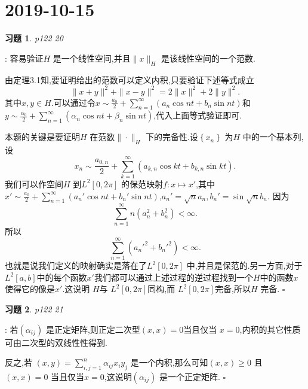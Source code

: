 \documentclass[a4paper]{article}
\newtheorem*{exe}{习题}
\newenvironment{sol}{{\noindent\bfseries 解}:}{\hfill $\square$\par}
\begin{document}
\section{2019-10-15}
\begin{exe}
  p122 20	
\end{exe}
\begin{sol}
  容易验证$H$ 是一个线性空间,并且$\|x\|_H$ 是该线性空间的一个范数.

  由定理3.1知,要证明给出的范数可以定义内积,只要验证下述等式成立
   \[
  \|x+y\|^2+\|x-y\|^2=2\|x\|^2+2\|y\|^2
  .\] 
  其中$x,y\in H$.可以通过令$x\sim \frac{a_0}{2}+\sum_{n=1}^{\infty} \left( a_n\cos nt +b_n\sin nt \right) $和$y\sim\frac{\alpha_0}{2}+\sum_{n=1}^{\infty} \left( \alpha_n\cos nt+\beta_n\sin nt \right) $,代入上面等式验证即可.

  本题的关键是要证明$H$ 在范数$\|\cdot \|_H$ 下的完备性.设$\left\{ x_n \right\} $ 为$H$ 中的一个基本列,设
  \[
    x_n\sim\frac{a_{0,n}}{2}+\sum_{k=1}^{\infty} \left( a_{k,n}\cos kt +b_{k,n}\sin kt \right) 
  .\] 
  我们可以作空间$H$ 到$L^2[0,2\pi]$ 的保范映射$f:x\mapsto x'$,其中$x'\sim \frac{a_0}{2}+\sum_{n=1}^{\infty} \left( a_n'\cos nt+b_n'\sin nt \right) $,$a_n'=\sqrt{n} a_n,b_n'=\sin\sqrt{n} b_n$.
  因为
  \[
    \sum_{n=1}^{\infty} n\left( a_n^2+b_n^2 \right) <\infty
  .\] 
  所以
   \[
     \sum_{n=1}^{\infty} \left( a_n'^2+b_n'^2 \right) <\infty
  .\] 
  也就是说我们定义的映射确实是落在了$L^2[0,2\pi]$ 中,并且是保范的.另一方面,对于$L^2[a,b]$中的每个函数$x'$我们都可以通过上述过程的逆过程找到一个$H$中的函数$x$使得它的像是$x'$.这说明 $H$与 $L^2[0,2\pi]$同构,而 $L^2[0,2\pi]$完备,所以$H$ 完备.
\end{sol}
\begin{exe}
  p122 21
\end{exe}
\begin{sol}
  若$\left(\alpha_{ij}\right)$ 是正定矩阵,则正定二次型$(x,x)=0$当且仅当 $x=0$,内积的其它性质可由二次型的双线性性得到.

  反之,若 $(x,y)=\sum_{i,j=1}^{n} \alpha_{ij}x_iy_j$ 是一个内积,那么可知$(x,x)\ge 0$ 且$(x,x)=0$ 当且仅当$x=0$,这说明$\left( \alpha_{ij} \right) $ 是一个正定矩阵.
\end{sol}
\end{document}
